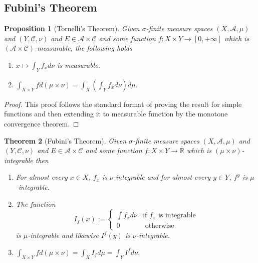 \documentclass[11pt]{article}
\newcommand{\defeq}{:=}
\newcommand{\R}{\mathbb{R}}
\newtheorem{theorem}{Theorem}[section]
\newtheorem{prop}[theorem]{Proposition}
\begin{document}
\subsection{Fubini's Theorem}
\begin{prop}[Tornelli's Theorem]
Given $\sigma$-finite measure spaces $(X, \mathcal{A}, \mu)$ and $(Y, \mathcal{C}, \nu)$ and $E\in\mathcal{A}\times \mathcal{C}$ and some function $f:X\times Y \to [0, +\infty]$ which is $(\mathcal{A}\times \mathcal{C})$-measurable, the following holds
\begin{enumerate}[label=(\alph*)]
	\item $x\mapsto \int_Y f_x d\nu$ is measurable.
	\item $\int_{X\times Y} f d(\mu\times\nu)=\int_X\left(\int_Y f_x d\nu\right)d\mu$.
\end{enumerate}
\end{prop}
\begin{proof}
This proof follows the standard format of proving the result for simple functions and then extending it to measurable function by the monotone convergence theorem.
\end{proof}
\begin{theorem}[Fubini's Theorem]
Given $\sigma$-finite measure spaces $(X, \mathcal{A}, \mu)$ and $(Y, \mathcal{C}, \nu)$ and $E\in\mathcal{A}\times \mathcal{C}$ and some function $f:X\times Y \to \overline{\R}$ which is $(\mu\times\nu)$-integrable then
\begin{enumerate}[label=(\alph*)]
	\item For almost every $x\in X$, $f_x$ is $\nu$-integrable and for almost every $y\in Y$, $f^y$ is $\mu$-integrable.
	\item The function
		\[
			I_f(x)\defeq
			\begin{cases}
				\int f_x d\nu & \text{if }f_x\text{ is integrable}\\
				0 & \text{ otherwise}
			\end{cases}
		\]
		is $\mu$-integrable and likewise $I^f(y)$ is $\nu$-integrable.
	\item $\int_{X\times Y} f d(\mu\times\nu)=\int_X I_f d\mu = \int_Y I^f d \nu$.
\end{enumerate}
\end{theorem}
\end{document}
